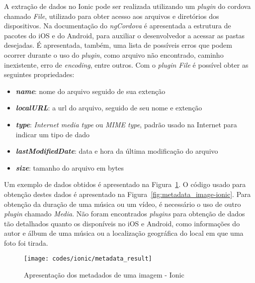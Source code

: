 
A extração de dados no Ionic pode ser realizada utilizando um \textit{plugin} do cordova chamado \textit{File}, utilizado para obter 
acesso aos arquivos e diretórios dos dispositivos. Na documentação do \textit{ngCordova} é apresentada a estrutura de pacotes do iOS e 
do Android, para auxiliar o desenvolvedor a acessar as pastas desejadas. É apresentada, também, uma lista de possíveis erros
que podem ocorrer durante o uso do \textit{plugin}, como arquivo não encontrado, caminho inexistente, erro de \textit{encoding}, entre outros.
Com o \textit{plugin File} é possível obter as seguintes propriedades:
 
\begin{itemize}
	\item \textbf{\textit{name}}: nome do arquivo seguido de sua extenção
	\item \textbf{\textit{localURL}}: a url do arquivo, seguido de seu nome e extenção
	\item \textbf{\textit{type}}: \textit{Internet media type} ou \textit{MIME type}, padrão usado na Internet para indicar um tipo de dado
	\item \textbf{\textit{lastModifiedDate}}: data e hora da última modificação do arquivo
	\item \textbf{\textit{size}}: tamanho do arquivo em bytes
\end{itemize}

Um exemplo de dados obtidos é apresentado na Figura~\ref{fig:metadata_result-ionic}. O código usado para 
obtenção destes dados é apresentado na Figura~\ref{fig:metadata_image-ionic}.
Para obtenção da duração de uma música ou um vídeo, é necessário o uso de outro  \textit{plugin} chamado \textit{Media}.
Não foram encontrados \textit{plugins} para obtenção de dados tão detalhados quanto os disponíveis no iOS e Android, como informações do autor 
e álbum de uma música ou a localização geográfica do local em que uma foto foi tirada.

\begin{figure}[H]
	\centering
	\texttt{[image: codes/ionic/metadata\_result]}
	\caption[Apresentação dos metadados de uma imagem - Ionic]{Apresentação dos metadados de uma imagem - Ionic}
	\label{fig:metadata_result-ionic}
\end{figure}

